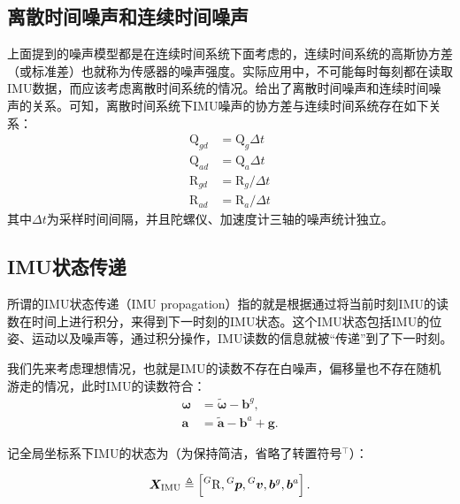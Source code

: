\subsection{离散时间噪声和连续时间噪声}

上面提到的噪声模型都是在连续时间系统下面考虑的，连续时间系统的高斯协方差（或标准差）也就称为传感器的噪声强度。实际应用中，不可能每时每刻都在读取IMU数据，而应该考虑离散时间系统的情况。\citep{smith1978exact}给出了离散时间噪声和连续时间噪声的关系。可知，离散时间系统下IMU噪声的协方差与连续时间系统存在如下关系：
\begin{equation}
\begin{aligned}
    \mathrm{Q}_{gd} &= \mathrm{Q}_g \Delta t   \\
    \mathrm{Q}_{ad} &= \mathrm{Q}_a \Delta t   \\
    \mathrm{R}_{gd} &= \mathrm{R}_g / \Delta t \\
    \mathrm{R}_{ad} &= \mathrm{R}_a / \Delta t
\end{aligned}
\end{equation}
其中$\Delta t$为采样时间间隔，并且陀螺仪、加速度计三轴的噪声统计独立。

\subsection{IMU状态传递}

所谓的IMU状态传递（IMU propagation）指的就是根据通过将当前时刻IMU的读数在时间上进行积分，来得到下一时刻的IMU状态。这个IMU状态包括IMU的位姿、运动以及噪声等，通过积分操作，IMU读数的信息就被“传递”到了下一时刻。

我们先来考虑理想情况，也就是IMU的读数不存在白噪声，偏移量也不存在随机游走的情况，此时IMU的读数符合：
\begin{equation}
\begin{aligned}
    \bm{\omega}  &= \tilde{\bm{\omega}} - \bm{b}^g, \\
    \bm{a} &= \tilde{\bm a} - \bm{b}^a + \bm{g}.
\end{aligned}
\end{equation}

记全局坐标系下IMU的状态为（为保持简洁，省略了转置符号${}^\top$）：

\begin{equation}
  \bm{X}_{\textrm{IMU}} \triangleq
  \left[
      \prescript{G}{}{\mathrm R},
      \prescript{G}{}{\bm p},
      \prescript{G}{}{\bm v},
      \bm{b}^g, \bm{b}^a
  \right].
\end{equation}

